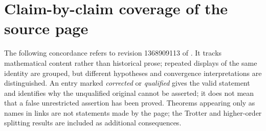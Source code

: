 \section{Claim-by-claim coverage of the source page}\label{app:coverage}
The following concordance refers to revision 1368909113 of \cite{wiki}. It
tracks mathematical content rather than historical prose; repeated displays
of the same identity are grouped, but different hypotheses and convergence
interpretations are distinguished. An entry marked \emph{corrected} or
\emph{qualified} gives the valid statement and identifies why the
unqualified original cannot be asserted; it does not mean that a false
unrestricted assertion has been proved. Theorems appearing only as names
in links are not statements made by the page; the Trotter and higher-order
splitting results are included as additional consequences.

